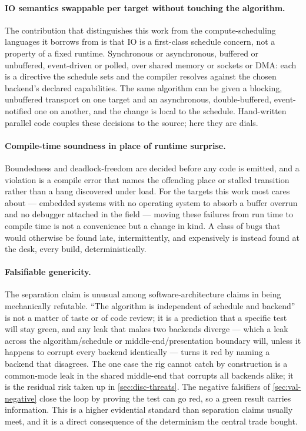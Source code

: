\paragraph{IO semantics swappable per target without touching the algorithm.}
The contribution that distinguishes this work from the compute-scheduling
languages it borrows from is that IO is a first-class schedule concern, not a
property of a fixed runtime. Synchronous or asynchronous, buffered or unbuffered,
event-driven or polled, over shared memory or sockets or DMA: each is a directive
the schedule sets and the compiler resolves against the chosen backend's declared
capabilities. The same algorithm can be given a blocking, unbuffered transport on
one target and an asynchronous, double-buffered, event-notified one on another,
and the change is local to the schedule. Hand-written parallel code couples these
decisions to the source; here they are dials.

\paragraph{Compile-time soundness in place of runtime surprise.} Boundedness and
deadlock-freedom are decided before any code is emitted, and a violation is a
compile error that names the offending place or stalled transition rather than a
hang discovered under load. For the targets this work most cares about --- embedded
systems with no operating system to absorb a buffer overrun and no debugger
attached in the field --- moving these failures from run time to compile time is
not a convenience but a change in kind. A class of bugs that would otherwise be
found late, intermittently, and expensively is instead found at the desk, every
build, deterministically.

\paragraph{Falsifiable genericity.} The separation claim is unusual among
software-architecture claims in being mechanically refutable. ``The algorithm is
independent of schedule and backend'' is not a matter of taste or of code review;
it is a prediction that a specific test will stay green, and any leak that makes
two backends diverge --- which a leak across the algorithm/schedule or
middle-end/presentation boundary will, unless it happens to corrupt every backend
identically --- turns it red by naming a backend that disagrees. The one case the
rig cannot catch by construction is a common-mode leak in the shared middle-end
that corrupts all backends alike; it is the residual risk taken up in
\cref{sec:disc-threats}. The negative falsifiers of \cref{sec:val-negative} close
the loop by proving the test can go red, so a green result carries information.
This is a higher evidential standard than separation claims usually meet, and it is
a direct consequence of the determinism the central trade bought.

